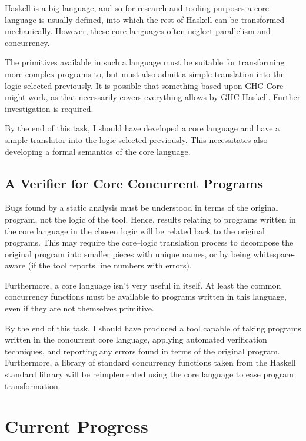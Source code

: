 Haskell is a big language, and so for research and tooling purposes a
core language is usually defined, into which the rest of Haskell can
be transformed mechanically. However, these core languages often
neglect parallelism and concurrency.

The primitives available in such a language must be suitable for
transforming more complex programs to, but must also admit a simple
translation into the logic selected previously. It is possible that
something based upon GHC Core might work, as that necessarily covers
everything allows by GHC Haskell. Further investigation is required.

By the end of this task, I should have developed a core language and
have a simple translator into the logic selected previously. This
necessitates also developing a formal semantics of the core language.

\subsection*{A Verifier for Core Concurrent Programs}
\label{sec:proposal-tasks-verifier}

Bugs found by a static analysis must be understood in terms of the
original program, not the logic of the tool. Hence, results relating
to programs written in the core language in the chosen logic will be
related back to the original programs. This may require the
core--logic translation process to decompose the original program into
smaller pieces with unique names, or by being whitespace-aware (if the
tool reports line numbers with errors).

Furthermore, a core language isn't very useful in itself. At least the
common concurrency functions must be available to programs written in
this language, even if they are not themselves primitive.

By the end of this task, I should have produced a tool capable of
taking programs written in the concurrent core language, applying
automated verification techniques, and reporting any errors found in
terms of the original program. Furthermore, a library of standard
concurrency functions taken from the Haskell standard library will be
reimplemented using the core language to ease program transformation.

\section{Current Progress}
\label{sec:proposal-progress}

